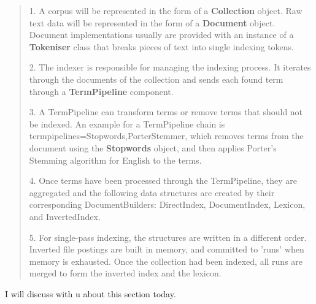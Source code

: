 \begin{quotation}
 \item 1. A corpus will be represented in the form of a \textbf{Collection} object. Raw text data will be represented in the form of a \textbf{Document} object. 
 Document implementations usually are provided with an instance of a \textbf{Tokeniser} class that breaks pieces of text into single indexing tokens.
 \item 2. The indexer is responsible for managing the indexing process. It iterates through the documents of the collection and sends each found 
 term through a \textbf{TermPipeline} component.
 \item 3. A TermPipeline can transform terms or remove terms that should not be indexed. An example for a TermPipeline chain is 
 termpipelines=Stopwords,PorterStemmer, which removes terms from the document using the \textbf{Stopwords} object, and then applies Porter's Stemming algorithm 
 for English to the terms.
 \item 4. Once terms have been processed through the TermPipeline, they are aggregated and the following data structures are created by their corresponding 
 DocumentBuilders: DirectIndex, DocumentIndex, Lexicon, and InvertedIndex.
 \item 5. For single-pass indexing, the structures are written in a different order. Inverted file postings are built in memory, and committed to 'runs' 
 when memory is exhausted. Once the collection had been indexed, all runs are merged to form the inverted index and the lexicon.
\end{quotation}

I will discuss with u about this section today.

